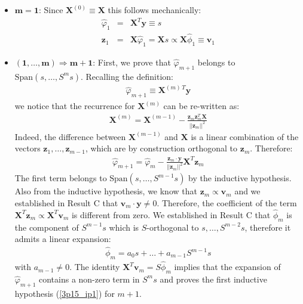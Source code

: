 \begin{itemize}
    \item $ \mathbf{m = 1}$: Since $\mathbf{X}^{(0)} \equiv \mathbf{X}$ this follows mechanically:
    \begin{eqnarray*}
        \hat{\varphi}_1 & = & \mathbf{X}^T \mathbf{y} \equiv s\\
        \mathbf{z}_1 & = & \mathbf{X} \hat{\varphi}_1 = \mathbf{X} s \propto \mathbf{X} \hat{\phi}_1 \equiv \mathbf{v}_1
    \end{eqnarray*}
    \item $\mathbf{(1, \ldots, m) \Rightarrow m + 1}$: First, we prove that $\hat{\varphi}_{m + 1}$ belongs to $\textrm{Span} \left( s, \ldots, S^m s \right)$. Recalling the definition:
    \begin{eqnarray*}
        \hat{\varphi}_{m + 1} \equiv \mathbf{X}^{(m) \, T} \mathbf{y}
    \end{eqnarray*}
    we notice that the recurrence for $\mathbf{X}^{(m)}$ can be re-written as:
    \begin{eqnarray} \label{3p15_unroll}
    \mathbf{X}^{(m)} = \mathbf{X}^{(m-1)} - \frac{ \mathbf{z}_m \mathbf{z}_m^T \mathbf{X}}{||\mathbf{z}_m||^2}
    \end{eqnarray}
    Indeed, the difference between $\mathbf{X}^{(m - 1)}$ and $\mathbf{X}$ is a linear combination of the vectors $\mathbf{z}_1, \ldots, \mathbf{z}_{m - 1}$, which are by 
    construction orthogonal to $\mathbf{z}_m$. Therefore:
    \begin{eqnarray*}
        \hat{\varphi}_{m + 1} = \hat{\varphi}_{m} - \frac{\mathbf{z}_m \cdot \mathbf{y}}{|| \mathbf{z}_m||^2} \mathbf{X}^T \mathbf{z}_m
    \end{eqnarray*}
    The first term belongs to $\textrm{Span}\left( s, \ldots, S^{m - 1}s \right)$ by the inductive hypothesis. Also from the inductive hypothesis, we know that $\mathbf{z}_m \propto \mathbf{v}_m$ and we
    established in Result C that $\mathbf{v}_m \cdot \mathbf{y} \neq 0$. Therefore, the coefficient of
    the term $\mathbf{X}^T \mathbf{z}_m \propto \mathbf{X}^T \mathbf{v}_m $ is different
    from zero. We established
    in Result C that $\hat{\phi}_m$ is the component of $S^{m - 1} s$ which is $S$-orthogonal to $s, \ldots, S^{m - 2} s$, therefore it admits a linear expansion:
    \begin{eqnarray*}
        \hat{\phi}_m = a_0 s + \ldots + a_{m - 1} S^{m - 1}s
    \end{eqnarray*}
    with $a_{m -1} \neq 0$. The identity $\mathbf{X}^T \mathbf{v}_m = S \hat{\phi}_m$ implies that the
    expansion of $\hat{\varphi}_{m + 1}$ contains a non-zero term in $S^m s$ and proves the first inductive hypothesis (\ref{3p15_ip1}) for $m + 1$.
    

\end{itemize}
